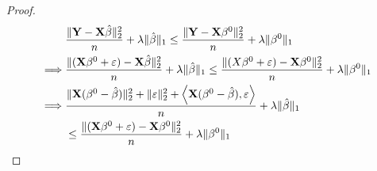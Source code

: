 \begin{proof}
    \begin{align*}
                 & \frac{\|\mathbf{Y}  - \mathbf{X} \hat{\beta} \|_{2}^{2}}{n} + \lambda \| \hat{\beta}\|_{1} \leq \frac{\| \mathbf{Y}  - \mathbf{X} \beta^0 \|_2^2}{n}+\lambda\|\beta^{0}\|_{1}                                                   \\
        \implies & \frac{\| ( \mathbf{X} \beta^0  + \varepsilon) - \mathbf{X} \hat{\beta} \|_{2}^{2}}{n} + \lambda \| \hat{\beta}\|_{1} \leq \frac{\| (X \beta^0  + \varepsilon)  - \mathbf{X} \beta^0 \|_2^2}{n}+\lambda\|\beta^{0}\|_{1} \\
        \implies & \frac{\| \mathbf{X} (\beta^0  - \hat{\beta}) \|_2^2 + \| \varepsilon \|_{2}^{2} + \left\langle \mathbf{X} (\beta^0  - \hat{\beta}), \varepsilon \right\rangle}{n} + \lambda \| \hat{\beta}\|_{1}                \\
                 & \leq \frac{\| (\mathbf{X} \beta^0  + \varepsilon)  - \mathbf{X} \beta^0 \|_2^2}{n}+\lambda\|\beta^{0}\|_{1}
    \end{align*}
\end{proof}